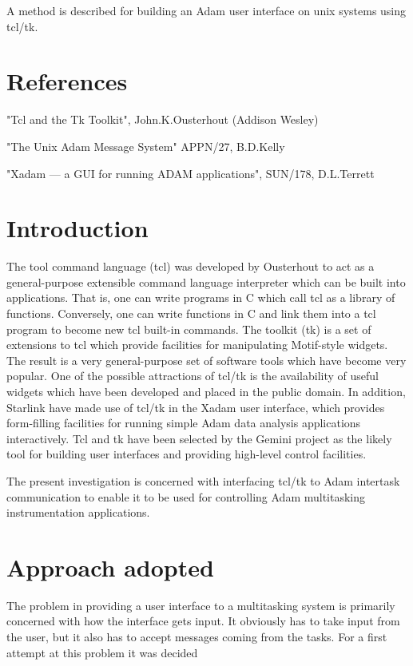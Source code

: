 A method is described for building an Adam user interface on unix
systems using tcl/tk.

\section {References}

"Tcl and the Tk Toolkit", John.K.Ousterhout (Addison Wesley)

"The Unix Adam Message System" APPN/27, B.D.Kelly

"Xadam --- a GUI for running ADAM applications", SUN/178, D.L.Terrett

\section {Introduction}

The tool command language (tcl) was developed by Ousterhout to act as a
general-purpose extensible command language interpreter which can be
built into applications. That is, one can write programs in C which call
tcl as a library of functions. Conversely, one can write functions in C
and link them into a tcl program to become new tcl built-in commands. The
toolkit (tk) is a set of extensions to tcl which provide facilities for
manipulating Motif-style widgets. The result is a very general-purpose
set of software tools which have become very popular. One of the possible
attractions of tcl/tk is the availability of useful widgets which have
been developed and placed in the public domain. In addition, Starlink
have made use of tcl/tk in the Xadam user interface, which provides
form-filling facilities for running simple Adam data analysis
applications interactively. Tcl and tk have been selected by the Gemini
project as the likely tool for building user interfaces and providing
high-level control facilities.

The present investigation is concerned with interfacing tcl/tk to Adam
intertask communication to enable it to be used for controlling Adam
multitasking instrumentation applications.

\section {Approach adopted}

The problem in providing a user interface to a multitasking system is
primarily concerned with how the interface gets input. It obviously has
to take input from the user, but it also has to accept messages coming
from the tasks. For a first attempt at this problem it was decided

